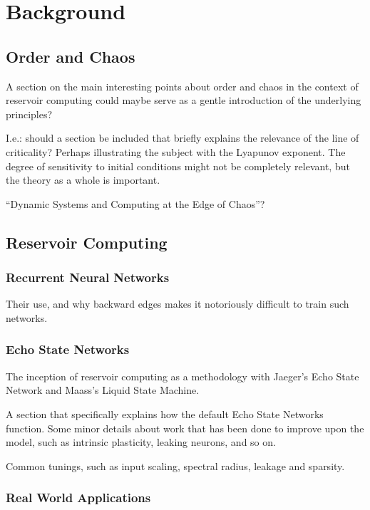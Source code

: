 \chapter{Background}

\section{Order and Chaos}

A section on the main interesting points about order and chaos in the context of
reservoir computing could maybe serve as a gentle introduction of the underlying
principles?

I.e.: should a section be included that briefly explains the relevance of the
line of criticality? Perhaps illustrating the subject with the Lyapunov
exponent. The degree of sensitivity to initial conditions might not be
completely relevant, but the theory as a whole is important.

``Dynamic Systems and Computing at the Edge of Chaos''?

\section{Reservoir Computing}

\subsection{Recurrent Neural Networks}

Their use, and why backward edges makes it notoriously difficult to train such
networks.

\subsection{Echo State Networks}

The inception of reservoir computing as a methodology with Jaeger's Echo State
Network and Maass's Liquid State Machine.

A section that specifically explains how the default Echo State Networks
function. Some minor details about work that has been done to improve upon the
model, such as intrinsic plasticity, leaking neurons, and so on.

Common tunings, such as input scaling, spectral radius, leakage and sparsity.

\subsection{Real World Applications}

